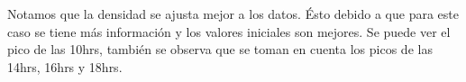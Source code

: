                                                                                                                                                                                                                                                                                                                                                                                                                                                                                 Notamos que la densidad se ajusta mejor a los datos. Ésto debido a que para este caso se tiene más información y los valores iniciales son mejores. Se puede ver el pico de las 10hrs, también se observa que se toman en cuenta los picos de las 14hrs, 16hrs y 18hrs.
                                                                                                                                                                                                                                                                                                                                                                                                                                                                                
